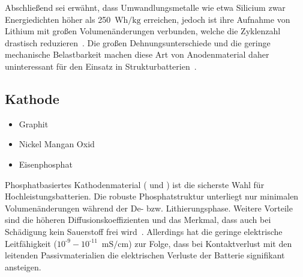 

Abschließend sei erwähnt, dass Umwandlungsmetalle wie etwa Silicium zwar Energiedichten höher als 250~$\si{\watt \hour \per \kg}$ erreichen, jedoch ist ihre Aufnahme von Lithium mit großen Volumenänderungen verbunden, welche die Zyklenzahl drastisch reduzieren~\cite{Gayet2009, Pereira2019}. Die großen Dehnungsunterschiede und die geringe mechanische Belastbarkeit machen diese Art von Anodenmaterial daher uninteressant für den Einsatz in Strukturbatterien~\cite{Javaid2018}.

\subsection{Kathode}

\begin{itemize}
	\item Graphit
	\item Nickel Mangan Oxid
	\item Eisenphosphat
\end{itemize}

Phosphatbasiertes Kathodenmaterial ( und ) ist die sicherste Wahl für Hochleistungsbatterien. Die robuste Phosphatstruktur unterliegt nur minimalen Volumenänderungen während der De- bzw. Lithierungsphase. Weitere Vorteile sind die höheren Diffusionskoeffizienten und das Merkmal, dass auch bei Schädigung kein Sauerstoff frei wird~\cite{Ling2021}. Allerdings hat die geringe elektrische Leitfähigkeit ($10^{\text{-}9}-10^{\text{-}11}$~$\si{\milli \siemens \per \cm}$) zur Folge, dass bei Kontaktverlust mit den leitenden Passivmaterialien die elektrischen Verluste der Batterie signifikant ansteigen.


